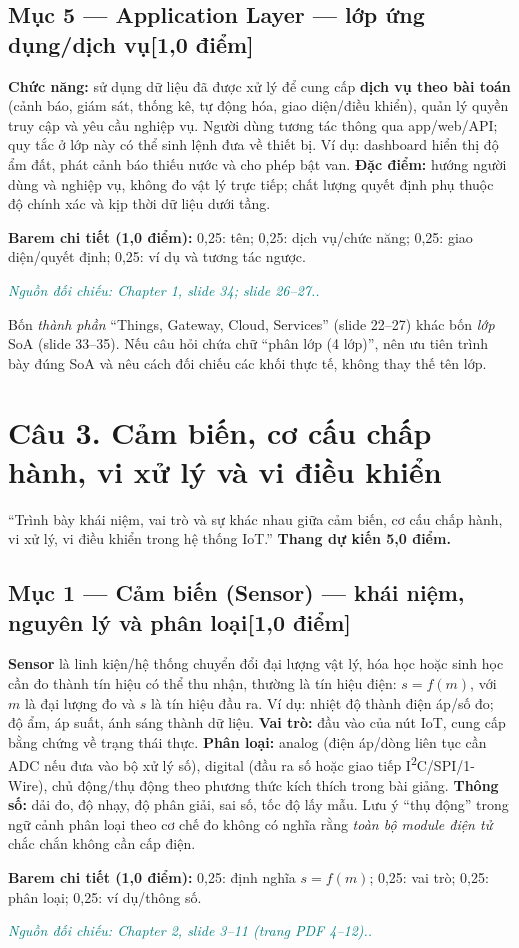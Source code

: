 \documentclass[11pt,a4paper]{article}
\newcommand{\pointpart}[2]{\subsection*{Mục #1 --- #2\hfill\normalsize\color{teal}[1,0 điểm]}}
\newcommand{\src}[1]{\par\noindent\textcolor{teal}{\footnotesize\textit{Nguồn đối chiếu: #1.}}\par}
\newcommand{\scoring}[1]{\par\noindent\textbf{Barem chi tiết (1,0 điểm):} #1\par}
\newcommand{\kw}[1]{\textbf{#1}}
\begin{document}
\pointpart{5}{Application Layer --- lớp ứng dụng/dịch vụ}
\kw{Chức năng:} sử dụng dữ liệu đã được xử lý để cung cấp \kw{dịch vụ theo bài toán} (cảnh báo, giám sát, thống kê, tự động hóa, giao diện/điều khiển), quản lý quyền truy cập và yêu cầu nghiệp vụ. Người dùng tương tác thông qua app/web/API; quy tắc ở lớp này có thể sinh lệnh đưa về thiết bị. Ví dụ: dashboard hiển thị độ ẩm đất, phát cảnh báo thiếu nước và cho phép bật van. \kw{Đặc điểm:} hướng người dùng và nghiệp vụ, không đo vật lý trực tiếp; chất lượng quyết định phụ thuộc độ chính xác và kịp thời dữ liệu dưới tầng.
\scoring{0,25: tên; 0,25: dịch vụ/chức năng; 0,25: giao diện/quyết định; 0,25: ví dụ và tương tác ngược.}
\src{Chapter 1, slide 34; slide 26--27.}
\begin{warningbox}Bốn \emph{thành phần} ``Things, Gateway, Cloud, Services'' (slide 22--27) khác bốn \emph{lớp} SoA (slide 33--35). Nếu câu hỏi chứa chữ ``phân lớp (4 lớp)'', nên ưu tiên trình bày đúng SoA và nêu cách đối chiếu các khối thực tế, không thay thế tên lớp.\end{warningbox}

\clearpage
\section{Câu 3. Cảm biến, cơ cấu chấp hành, vi xử lý và vi điều khiển}
\begin{questionbox}
``Trình bày khái niệm, vai trò và sự khác nhau giữa cảm biến, cơ cấu chấp hành, vi xử lý, vi điều khiển trong hệ thống IoT.'' \textbf{Thang dự kiến 5,0 điểm.}
\end{questionbox}
\pointpart{1}{Cảm biến (Sensor) --- khái niệm, nguyên lý và phân loại}
\kw{Sensor} là linh kiện/hệ thống chuyển đổi đại lượng vật lý, hóa học hoặc sinh học cần đo thành tín hiệu có thể thu nhận, thường là tín hiệu điện: $s=f(m)$, với $m$ là đại lượng đo và $s$ là tín hiệu đầu ra. Ví dụ: nhiệt độ thành điện áp/số đo; độ ẩm, áp suất, ánh sáng thành dữ liệu. \kw{Vai trò:} đầu vào của nút IoT, cung cấp bằng chứng về trạng thái thực. \kw{Phân loại:} analog (điện áp/dòng liên tục cần ADC nếu đưa vào bộ xử lý số), digital (đầu ra số hoặc giao tiếp I\textsuperscript{2}C/SPI/1-Wire), chủ động/thụ động theo phương thức kích thích trong bài giảng. \kw{Thông số:} dải đo, độ nhạy, độ phân giải, sai số, tốc độ lấy mẫu. Lưu ý ``thụ động'' trong ngữ cảnh phân loại theo cơ chế đo không có nghĩa rằng \emph{toàn bộ module điện tử} chắc chắn không cần cấp điện.
\scoring{0,25: định nghĩa $s=f(m)$; 0,25: vai trò; 0,25: phân loại; 0,25: ví dụ/thông số.}
\src{Chapter 2, slide 3--11 (trang PDF 4--12).}
\end{document}

